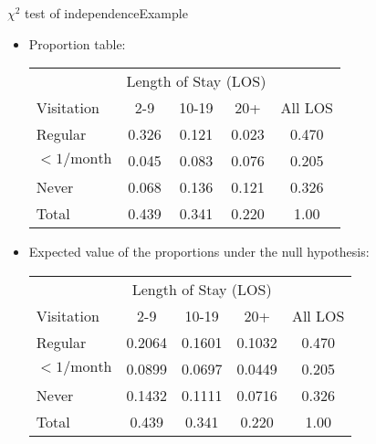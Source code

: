 \documentclass[xcolor=dvipsnames]{beamer}
\begin{document}
\begin{frame}{$\chi^2$ test of independence}{Example}
	\begin{itemize}
		\item Proportion table:
		\vspace{1mm}
		{\scriptsize
		\begin{center}
			\begin{tabular}{|l|ccc|c|}
				\hline
				& \multicolumn{3}{c|}{Length of Stay (LOS)} & \\
				Visitation & 2-9 & 10-19 & 20+ & All LOS \\ \hline
				Regular & 0.326 & 0.121 & 0.023 & 0.470\\ 
				$<1/\text{month}$ & 0.045 & 0.083 & 0.076 & 0.205 \\
				Never & 0.068 & 0.136 & 0.121 & 0.326\\ \hline
				Total & 0.439 & 0.341 & 0.220 & 1.00\\ \hline
			\end{tabular}
		\end{center}}
	\vspace{1mm}
	\item Expected value of the proportions under the null hypothesis:
	\vspace{1mm}
		{\scriptsize
			\begin{center}
				\begin{tabular}{|l|ccc|c|}
					\hline
					& \multicolumn{3}{c|}{Length of Stay (LOS)} & \\
					Visitation & 2-9 & 10-19 & 20+ & All LOS \\ \hline
					Regular           &0.2064 &0.1601 &0.1032 & 0.470\\
					$<1/\text{month}$ &0.0899 &0.0697 &0.0449 & 0.205\\
					Never             &0.1432 &0.1111 &0.0716 & 0.326\\ \hline
					Total & 0.439 & 0.341 & 0.220 & 1.00\\ \hline
				\end{tabular}
		\end{center}}
	\end{itemize}
\end{frame}
\end{document}
